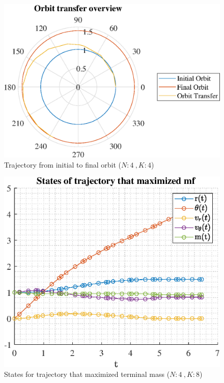 \documentclass[]{article}
\begin{document}
	\begin{figure}
		\centering
		\includegraphics[scale=0.75]{orbit_N4_K4_C3_mf.eps}
		\caption{Trajectory from initial to final orbit (\(N:4\ , K:4\))}
		\label{fig:orbit_N4_K4_C3_mf}
	\end{figure}
	\begin{figure}
		\centering
		\includegraphics[scale=0.75]{states_N4_K8_C3_mf.eps}
		\caption{States for trajectory that maximized terminal mass (\(N:4\ , K:8\))}
		\label{fig:states_N4_K8_C3_mf}
	\end{figure}
\end{document}
